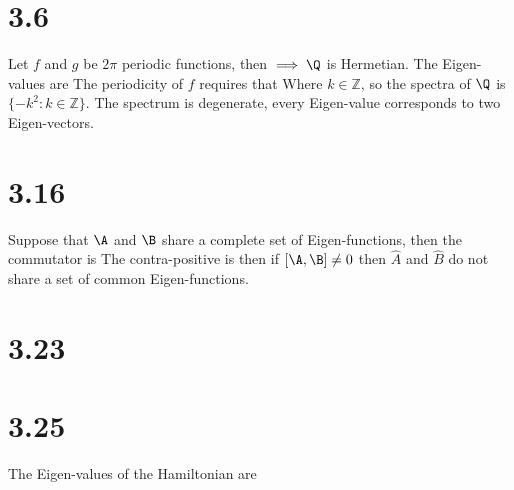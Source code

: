 \section*{3.6}
Let $f$ and $g$ be $2\pi$ periodic functions, then
$\implies \Q$ is Hermetian. The Eigen-values are
The periodicity of $f$ requires that
Where $k\in \mathbb{Z}$, so the spectra of $\Q$ is $\{ -k^2: k\in \mathbb{Z} \}$. The spectrum is degenerate, every Eigen-value corresponds to two Eigen-vectors. 
\section*{3.16}
Suppose that $\A$ and $\B$ share a complete set of Eigen-functions, then the commutator is
\eq{
[\A,\B] &= \A\B-\B\A\\
}
The contra-positive is then if $[\A,\B] \neq 0$ then $\hat{A}$ and $\hat{B}$ do not share a set of common Eigen-functions.
\section*{3.23}
\section*{3.25}
The Eigen-values of the Hamiltonian are
\eq{
\ham \ket{\psi} &= \la \ket{\psi}\\
}
